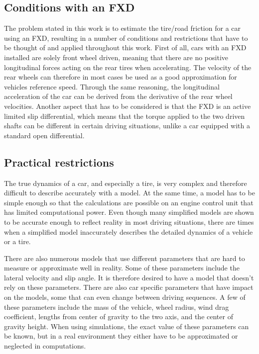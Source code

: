 \subsection{Conditions with an FXD}

The problem stated in this work is to estimate the tire/road friction for a car using an FXD, resulting in a number of conditions and restrictions that have to be thought of and applied throughout this work. First of all, cars with an FXD installed are solely front wheel driven, meaning that there are no positive longitudinal forces acting on the rear tires when accelerating. The velocity of the rear wheels can therefore in most cases be used as a good approximation for vehicles reference speed. Through the same reasoning, the longitudinal acceleration of the car can be derived from the derivative of the rear wheel velocities. Another aspect that has to be considered is that the FXD is an active limited slip differential, which means that the torque applied to the two driven shafts can be different in certain driving situations, unlike a car equipped with a standard open differential. 

\subsection{Practical restrictions}

The true dynamics of a car, and especially a tire, is very complex and therefore difficult to describe accurately with a model. At the same time, a model has to be simple enough so that the calculations are possible on an engine control unit that has limited computational power. Even though many simplified models are shown to be accurate enough to reflect reality in most driving situations, there are times when a simplified model inaccurately describes the detailed dynamics of a vehicle or a tire. 

There are also numerous models that use different parameters that are hard to measure or approximate well in reality. Some of these parameters include the lateral velocity and slip angle. It is therefore desired to have a model that doesn't rely on these parameters. There are also car specific parameters that have impact on the models, some that can even change between driving sequences. A few of these parameters include the mass of the vehicle, wheel radius, wind drag coefficient, lengths from center of gravity to the two axis, and the center of gravity height. When using simulations, the exact value of these parameters can be known, but in a real environment they either have to be approximated or neglected in computations.

